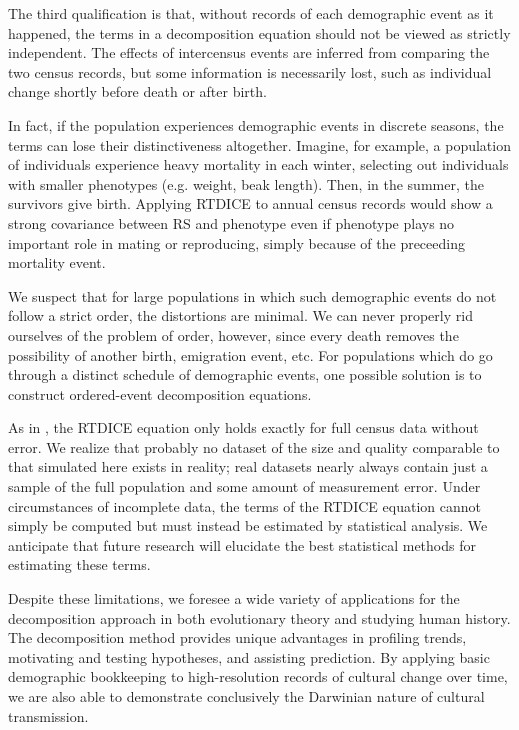 \documentclass[11pt]{article}
\begin{document}
The third qualification is that, without records of each demographic event as it happened, the terms in a decomposition equation should not be viewed as strictly independent.  The effects of intercensus events are inferred from comparing the two census records, but some information is necessarily lost, such as individual change shortly before death or after birth. 

In fact, if the population experiences demographic events in discrete seasons, the terms can lose their distinctiveness altogether.  Imagine, for example, a population of individuals experience heavy mortality in each winter, selecting out individuals with smaller phenotypes (e.g. weight, beak length).  Then, in the summer, the survivors give birth.  Applying RTDICE to annual census records would show a strong covariance between RS and phenotype even if phenotype plays no important role in mating or reproducing, simply because of the preceeding mortality event.  

We suspect that for large populations in which such demographic events do not follow a strict order, the distortions are minimal.  We can never properly rid ourselves of the problem of order, however, since every death removes the possibility of another birth, emigration event, etc.  For populations which do go through a distinct schedule of demographic events, one possible solution is to construct ordered-event decomposition equations.  

As in \cite{coulson2008dynamics}, the RTDICE equation only holds exactly for full census data without error. We realize that probably no dataset of the size and quality comparable to that simulated here exists in reality; real datasets nearly always contain just a sample of the full population and some amount of measurement error. Under circumstances of incomplete data, the terms of the RTDICE equation cannot simply be computed but must instead be estimated by statistical analysis. We anticipate that future research will elucidate the best statistical methods for estimating these terms.

Despite these limitations, we foresee a wide variety of applications for the decomposition approach in both evolutionary theory and studying human history.  The decomposition method provides unique advantages in profiling trends, motivating and testing hypotheses, and assisting prediction.  By applying basic demographic bookkeeping to high-resolution records of cultural change over time, we are also able to demonstrate conclusively the Darwinian nature of cultural transmission.



\end{document}
